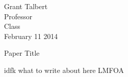 \documentclass[12pt]{article}
\begin{document}
\begin{flushleft}

Grant Talbert\\
Professor\\
Class\\
February 11 2014\\


\begin{center}
Paper Title
\end{center}


\setlength{\parindent}{0.5in}


idfk what to write about here LMFOA


\end{flushleft}
\end{document}
